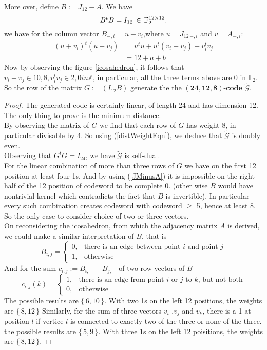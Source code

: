 \documentclass[12pt]{article}
\theoremstyle{definition}
\numberwithin{equation}{theorem}
\numberwithin{figure}{theorem}
\newcommand{\Ftwo}{\ensuremath{\mathbb{F}_2}}
\newcommand{\cCodes}{\ensuremath{\widetilde{\mathcal{G}}}}
\newcommand{\linearCode}[3]{\ensuremath{\bm{(#1,#2,#3)\mbox{-}code}}}
\newcommand{\myMatrixRing}[2]{\ensuremath{#1^{#2\times#2}}}
\newcommand{\Integer}{\ensuremath{\mathbb{Z}}}
\begin{document}
More over, define $B := J_{12} - A$. We have 
\begin{equation}\label{JMinusA}
	B^tB = I_{12} \,\in \,{\myMatrixRing{\Ftwo}{12}}.\\
\end{equation}
we have for the column vector $B_{-,i} = u + v_i$,where $u = J_{12\,-,i}$ and $v = A_{-,i}$:
\begin{align*}
	(u + v_i)^t(u + v_j) &= u^tu + u^t(v_i + v_j) + v_i^tv_j\\
						 &= 12 + a + b
\end{align*}
Now by observing the figure \ref{icosahedron}, it follows that
$v_i + v_j \in {10,8}, v_i^tv_j \in {2,0} in \Integer$, in particular, all the three terms above are 0 in $\Ftwo$. So  the row of the matrix $G := (I_{12} B)$  generate the the {\linearCode{24}{12}{8}} \cCodes.
\begin{proof}
The generated code is certainly linear, of length 24 and has dimension 12. The only thing to prove is the minimum distance.\\
By observing the matrix of $G$ we find that each row of $G$ has weight 8, in particular divisable by 4. So using (\ref{distWeightEqn}), we deduce that {\cCodes} is doubly even.\\
Observing that $G^tG = I_{24}$, we have {\cCodes} is self-dual.\\
For the linear combination of more than three rows of $G$ we have on the first 12 position at least four 1s. And by using (\ref{JMinusA}) it is impossible on the right half of the 12 position of codeword to be complete 0. (other wise $B$ would have nontrivial kernel which contradicts the fact that $B$ is invertible). In particular every such combination creates codeword with codeword $\geq$ 5, hence at least 8. So the only case to consider choice of two or three vectors. \\
On reconsidering the icosahedron, from which the adjacency matrix $A$ is derived, we could make a similar interpretation of $B$, that is 
\[
	B_{i,j} = 
	\begin{cases}
		0, &\text{there is an edge between point $i$ and point $j$}\\
		1, &\text{otherwise}
	\end{cases}
\]
And for the sum $c_{i,j} := B_{i,-} + B_{j,-} $ of two row vectors of $B$
\[
	c_{i,j}(k) = 
	\begin{cases}
		1, &\text{there is an edge from point $i$ or $j$ to $k$, but not both}\\
		0, &\text{otherwise}
	\end{cases}
\]
The possible results are $\{\,6,10\,\}$. With two 1s on the left 12 positions,  the weights are $\{\,8,12\,\}$
Similarly, for the sum of three vectors $v_i$ ,$v_j$ and $v_k$, there is a 1 at position $l$ if vertice $l$ is connected to exactly two of the three or none of the three.
  the possible results are $\{\,5,9\,\}$. With three 1s on the left 12 poisitions, the weights are $\{\,8,12\,\}$. 
\end{proof}
\end{document}
